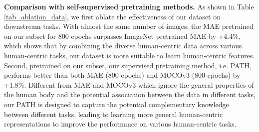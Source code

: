 \documentclass[10pt,twocolumn,letterpaper]{article}
\begin{document}
\begin{table}[t]
  \centering
  \caption{Comparison with self-supervised pretraining methods on ImageNet and the subset of our HumanBench.  indicates the results are repoted as 1-heavy occluded MR for averaging.}
 \vspace{-1em}
 \label{tab_ablation_data}\end{table} 
\noindent \textbf{Comparison with self-supervised pretraining methods.} 
As shown in Table \ref{tab_ablation_data}, we first ablate the effectiveness of our dataset on downstream tasks. With almost the same number of images, the MAE pretrained on our subset for 800 epochs surpasses ImageNet pretrained MAE by +4.4\%, which shows that by combining the diverse human-centric data across various human-centric tasks, our dataset is more suitable to learn human-centric features. Second, pretrained on our subset, our supervised pretraining method, i.e. PATH, performs better than both MAE (800 epochs) and MOCOv3 (800 epochs) by +1.8\%. Different from MAE and MOCOv3 which ignore the general properties of the human body and the potential association between the data in different tasks, our PATH is designed to capture the potential complementary knowledge between different tasks, leading to learning more general human-centric representations to improve the performance on various human-centric tasks. 
\end{document}
